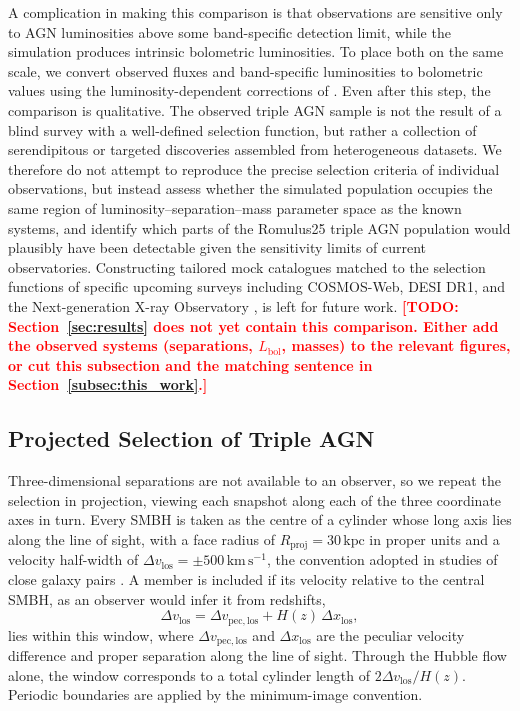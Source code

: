 \documentclass[twocolumn, 10pt]{article}
\newcommand{\todo}[1]{\textcolor{red}{\textbf{[TODO: #1]}}}
\begin{document}
A complication in making this comparison is that observations are sensitive only to AGN luminosities above some band-specific detection limit, while the simulation produces intrinsic bolometric luminosities. To place both on the same scale, we convert observed fluxes and band-specific luminosities to bolometric values using the luminosity-dependent corrections of \citet{Duras2020}. Even after this step, the comparison is qualitative. The observed triple AGN sample is not the result of a blind survey with a well-defined selection function, but rather a collection of serendipitous or targeted discoveries assembled from heterogeneous datasets. We therefore do not attempt to reproduce the precise selection criteria of individual observations, but instead assess whether the simulated population occupies the same region of luminosity--separation--mass parameter space as the known systems, and identify which parts of the Romulus25 triple AGN population would plausibly have been detectable given the sensitivity limits of current observatories. Constructing tailored mock catalogues matched to the selection functions of specific upcoming surveys including COSMOS-Web, DESI DR1, and the Next-generation X-ray Observatory \citep[AXIS;][]{Foord2023}, is left for future work. \todo{Section~\ref{sec:results} does not yet contain this comparison. Either add the observed systems (separations, $L_\mathrm{bol}$, masses) to the relevant figures, or cut this subsection and the matching sentence in Section~\ref{subsec:this_work}.}

\subsection{Projected Selection of Triple AGN}
\label{subsec:projected_selection}

Three-dimensional separations are not available to an observer, so we repeat the selection in projection, viewing each snapshot along each of the three coordinate axes in turn. Every SMBH is taken as the centre of a cylinder whose long axis lies along the line of sight, with a face radius of $R_\mathrm{proj} = 30\,\mathrm{kpc}$ in proper units and a velocity half-width of $\Delta v_\mathrm{los} = \pm 500\,\mathrm{km\,s^{-1}}$, the convention adopted in studies of close galaxy pairs \citep{Patton2000}. A member is included if its velocity relative to the central SMBH, as an observer would infer it from redshifts,
%
\begin{equation}
    \Delta v_\mathrm{los} = \Delta v_\mathrm{pec,los} + H(z)\,\Delta x_\mathrm{los},
    \label{eq:dvlos}
\end{equation}
%
lies within this window, where $\Delta v_\mathrm{pec,los}$ and $\Delta x_\mathrm{los}$ are the peculiar velocity difference and proper separation along the line of sight. Through the Hubble flow alone, the window corresponds to a total cylinder length of $2\Delta v_\mathrm{los}/H(z)$. Periodic boundaries are applied by the minimum-image convention.
\end{document}
